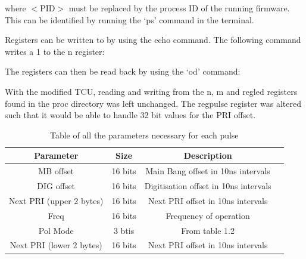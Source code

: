 \documentclass[12pt, a4paper]{article}
\begin{document}

where $<$PID$>$ must be replaced by the process ID of the running firmware. This can be identified by running the ‘ps’ command in the terminal.

Registers can be written to by using the echo command. The following command writes a 1 to the n register:



The registers can then be read back by using the ‘od’ command:




With the modified TCU, reading and writing from the n, m and reg\textunderscore led registers found in the proc directory was left unchanged. The reg\textunderscore pulse register was altered such that it would be able to handle 32 bit values for the PRI offset.

\begin{table}
\centering
\begin{tabular}{ |c|c|c|c| } 
 \hline
 Parameter & Size &  Description \\ 
 
 \hline 
 MB offset & 16 bits & Main Bang offset in 10ns intervals \\ 
 
 \hline
 DIG offset & 16 bits & Digitisation offset in 10ns intervals \\
 
 \hline
 Next PRI (upper 2 bytes) & 16 bits & Next PRI offset in 10ns intervals \\
 
 \hline
 Freq & 16 bits & Frequency of operation \\
 
 \hline
 Pol Mode & 3 btis & From table 1.2 \\
 
 \hline
 Next PRI (lower 2 bytes) & 16 bits & Next PRI offset in 10ns intervals\\
 \hline 
\end{tabular}
\caption{Table of all the parameters necessary for each pulse}
\label{table:1}
\end{table}
\end{document}
